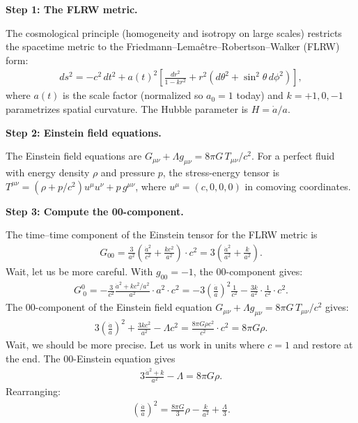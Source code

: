 \textbf{Step 1: The FLRW metric.}

The cosmological principle (homogeneity and isotropy on large scales) restricts the spacetime metric to the Friedmann--Lema\^etre--Robertson--Walker (FLRW) form:
\begin{align}
ds^2 = -c^2\,dt^2 + a(t)^2\left[\frac{dr^2}{1 - kr^2} + r^2(d\theta^2 + \sin^2\theta\,d\phi^2)\right],
\end{align}
where $a(t)$ is the scale factor (normalized so $a_0 = 1$ today) and $k = +1, 0, -1$ parametrizes spatial curvature. The Hubble parameter is $H = \dot{a}/a$.

\textbf{Step 2: Einstein field equations.}

The Einstein field equations are $G_{\mu\nu} + \Lambda g_{\mu\nu} = 8\pi G\,T_{\mu\nu}/c^2$. For a perfect fluid with energy density $\rho$ and pressure $p$, the stress-energy tensor is $T^{\mu\nu} = (\rho + p/c^2)u^\mu u^\nu + p\,g^{\mu\nu}$, where $u^\mu = (c, 0, 0, 0)$ in comoving coordinates.

\textbf{Step 3: Compute the 00-component.}

The time--time component of the Einstein tensor for the FLRW metric is
\begin{align}
G_{00} = \frac{3}{a^2}\left(\frac{\dot{a}^2}{c^2} + \frac{kc^2}{a^2}\right) \cdot c^2 = 3\left(\frac{\dot{a}^2}{a^2} + \frac{k}{a^2}\right).
\end{align}
Wait, let us be more careful. With $g_{00} = -1$, the 00-component gives:
\begin{align}
G^0_{\ 0} = -\frac{3}{c^2}\frac{\dot{a}^2 + kc^2/a^2}{a^2}\cdot a^2 \cdot c^2 = -3\left(\frac{\dot{a}}{a}\right)^2\frac{1}{c^2} - \frac{3k}{a^2}\cdot\frac{1}{c^2}\cdot c^2.
\end{align}
The $00$-component of the Einstein field equation $G_{\mu\nu} + \Lambda g_{\mu\nu} = 8\pi G\,T_{\mu\nu}/c^2$ gives:
\begin{align}
3\left(\frac{\dot{a}}{a}\right)^2 + \frac{3kc^2}{a^2} - \Lambda c^2 = \frac{8\pi G\rho c^2}{c^2} \cdot c^2 = 8\pi G\rho.
\end{align}
Wait, we should be more precise. Let us work in units where $c = 1$ and restore at the end. The 00-Einstein equation gives
\begin{align}
3\frac{\dot{a}^2 + k}{a^2} - \Lambda = 8\pi G\rho.
\end{align}
Rearranging:
\begin{align}
\left(\frac{\dot{a}}{a}\right)^2 = \frac{8\pi G}{3}\rho - \frac{k}{a^2} + \frac{\Lambda}{3}.
\end{align}

